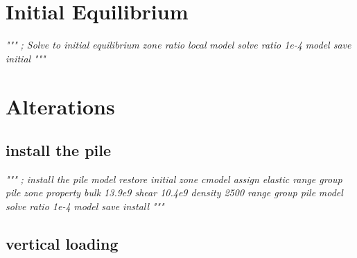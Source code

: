 \documentclass[a4paper, nobind]{templates/ociamthesis}
\newenvironment{Shaded}{\begin{snugshade}}{\end{snugshade}}
\newcommand{\CommentTok}[1]{\textcolor[rgb]{0.56,0.35,0.01}{\textit{#1}}}
\renewenvironment{Shaded}
{
  \vspace{10pt}%
  \begin{snugshade}%
}{%
  \end{snugshade}%
  \vspace{8pt}%
}
\begin{document}
\hypertarget{initial-equilibrium}{%
\section{Initial Equilibrium}\label{initial-equilibrium}}

\begin{Shaded}
\begin{Highlighting}[]
\CommentTok{"""}
\CommentTok{; Solve to initial equilibrium}
\CommentTok{zone ratio local}
\CommentTok{model solve ratio 1e{-}4}
\CommentTok{model save \textquotesingle{}initial\textquotesingle{}}
\CommentTok{"""}
\end{Highlighting}
\end{Shaded}

\hypertarget{alterations}{%
\section{Alterations}\label{alterations}}

\hypertarget{install-the-pile}{%
\subsection{install the pile}\label{install-the-pile}}

\begin{Shaded}
\begin{Highlighting}[]
\CommentTok{"""}
\CommentTok{; install the pile}
\CommentTok{model restore \textquotesingle{}initial\textquotesingle{}}
\CommentTok{zone cmodel assign elastic                          range group \textquotesingle{}pile\textquotesingle{}}
\CommentTok{zone property bulk 13.9e9 shear 10.4e9 density 2500 range group \textquotesingle{}pile\textquotesingle{}}
\CommentTok{model solve ratio 1e{-}4}
\CommentTok{model save \textquotesingle{}install\textquotesingle{}}
\CommentTok{"""}
\end{Highlighting}
\end{Shaded}

\hypertarget{vertical-loading}{%
\subsection{vertical loading}\label{vertical-loading}}
\end{document}
